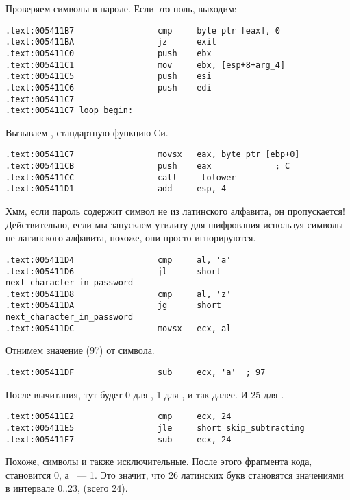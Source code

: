 Проверяем символы в пароле. Если это ноль, выходим:

\begin{lstlisting}[style=customasm]
.text:005411B7                 cmp     byte ptr [eax], 0
.text:005411BA                 jz      exit
.text:005411C0                 push    ebx
.text:005411C1                 mov     ebx, [esp+8+arg_4]
.text:005411C5                 push    esi
.text:005411C6                 push    edi
.text:005411C7
.text:005411C7 loop_begin:
\end{lstlisting}

Вызываем , стандартную функцию Си.

\begin{lstlisting}[style=customasm]
.text:005411C7                 movsx   eax, byte ptr [ebp+0]
.text:005411CB                 push    eax             ; C
.text:005411CC                 call    _tolower
.text:005411D1                 add     esp, 4
\end{lstlisting}

Хмм, если пароль содержит символ не из латинского алфавита, он пропускается!
Действительно, если мы запускаем утилиту для шифрования используя символы не латинского алфавита, 
похоже, они просто игнорируются.

\begin{lstlisting}[style=customasm]
.text:005411D4                 cmp     al, 'a'
.text:005411D6                 jl      short next_character_in_password
.text:005411D8                 cmp     al, 'z'
.text:005411DA                 jg      short next_character_in_password
.text:005411DC                 movsx   ecx, al
\end{lstlisting}

Отнимем значение  (97) от символа.

\begin{lstlisting}[style=customasm]
.text:005411DF                 sub     ecx, 'a'  ; 97
\end{lstlisting}

После вычитания, тут будет 0 для , 1 для , и так далее. И 25 для .

\begin{lstlisting}[style=customasm]
.text:005411E2                 cmp     ecx, 24
.text:005411E5                 jle     short skip_subtracting
.text:005411E7                 sub     ecx, 24
\end{lstlisting}

Похоже, символы  и  также исключительные.
После этого фрагмента кода,  становится 0, а  ~--- 1.
Это значит, что 26 латинских букв становятся значениями в интервале 0..23, (всего 24).

